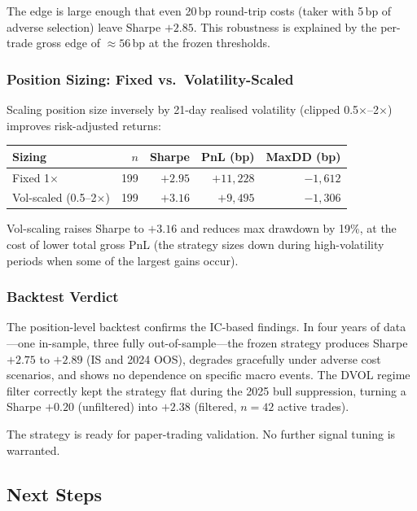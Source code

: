 \documentclass[12pt, a4paper]{article}
\theoremstyle{definition}
\begin{document}
The edge is large enough that even 20\,bp round-trip costs (taker with
5\,bp of adverse selection) leave Sharpe $+2.85$.  This robustness is
explained by the per-trade gross edge of $\approx 56$\,bp at the frozen
thresholds.

\subsubsection*{Position Sizing: Fixed vs.\ Volatility-Scaled}

Scaling position size inversely by 21-day realised volatility (clipped
0.5$\times$--2$\times$) improves risk-adjusted returns:

\begin{center}
\begin{tabular}{lrrrr}
\hline
Sizing & $n$ & Sharpe & PnL (bp) & MaxDD (bp) \\
\hline
Fixed 1$\times$           & 199 & $+2.95$ & $+11{,}228$ & $-1{,}612$ \\
Vol-scaled (0.5--2$\times$) & 199 & $+3.16$ & $+9{,}495$  & $-1{,}306$ \\
\hline
\end{tabular}
\end{center}

Vol-scaling raises Sharpe to $+3.16$ and reduces max drawdown by 19\%,
at the cost of lower total gross PnL (the strategy sizes down during
high-volatility periods when some of the largest gains occur).

\subsubsection*{Backtest Verdict}

The position-level backtest confirms the IC-based findings.
In four years of data---one in-sample, three fully out-of-sample---the
frozen strategy produces Sharpe $+2.75$ to $+2.89$ (IS and 2024 OOS),
degrades gracefully under adverse cost scenarios, and shows no dependence
on specific macro events.  The DVOL regime filter correctly kept the
strategy flat during the 2025 bull suppression, turning a Sharpe $+0.20$
(unfiltered) into $+2.38$ (filtered, $n=42$ active trades).

The strategy is ready for paper-trading validation.  No further signal
tuning is warranted.

\subsection{Next Steps}
\label{sec:nextsteps}
\end{document}
